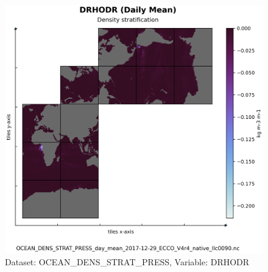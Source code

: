 \begin{figure}[H]
\centering
\includegraphics[scale=0.55]{../images/plots/native_plots/Ocean_Density_Stratification_and_Hydrostatic_Pressure/DRHODR.png}
\caption{Dataset: OCEAN\_DENS\_STRAT\_PRESS, Variable: DRHODR}
\label{tab:table-OCEAN_DENS_STRAT_PRESS_DRHODR-Plot}
\end{figure}
\pagebreak
